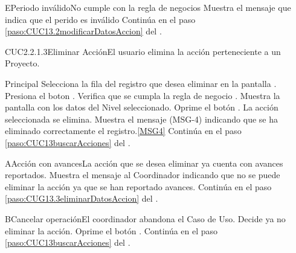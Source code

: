 		\begin{UCtrayectoriaA}{E}{Periodo inválido}{No cumple con la regla de negocios }
			\UCpaso Muestra el mensaje  que indica que el perido es inválido
			\UCpaso Continúa en el paso \ref{paso:CUC13.2modificarDatosAccion} del .
		\end{UCtrayectoriaA}

	\begin{UseCase}{CUC2.2.1.3}{Eliminar Acción}{El usuario elimina la acción perteneciente a un Proyecto.}
	\end{UseCase}

	\begin{UCtrayectoria}{Principal}
			\UCpaso[\UCactor] Selecciona la fila del registro que desea eliminar en la pantalla .
			\UCpaso[\UCactor] Presiona el boton .
			\UCpaso Verifica que se cumpla la regla de negocio . 
			\UCpaso Muestra la pantalla  con los datos del Nivel seleccionado. \label{paso:CUG13.3eliminarDatosAccion}
			\UCpaso [\UCactor] Oprime el botón . 
			\UCpaso La acción seleccionada se elimina.
			\UCpaso Muestra el mensaje (MSG-4) indicando que se ha eliminado correctamente el registro.\ref{MSG4}
			\UCpaso Continúa en el paso \ref{paso:CUC13buscarAcciones} del .
	\end{UCtrayectoria}


		\begin{UCtrayectoriaA}{A}{Acción con avances}{La acción que se desea eliminar ya cuenta con avances reportados.}
			\UCpaso Muestra el mensaje  al Coordinador indicando que no se puede eliminar la acción ya que se han reportado avances.
			\UCpaso Continúa en el paso \ref{paso:CUG13.3eliminarDatosAccion} del .
		\end{UCtrayectoriaA}
		\begin{UCtrayectoriaA}{B}{Cancelar operación}{El coordinador abandona el Caso de Uso.}
			\UCpaso[\UCactor] Decide ya no eliminar la acción.
			\UCpaso[\UCactor] Oprime el botón .
			\UCpaso Continúa en el paso \ref{paso:CUC13buscarAcciones} del .
		\end{UCtrayectoriaA}
		
